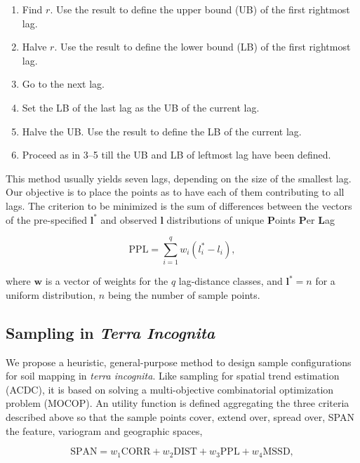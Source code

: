 \begin{enumerate}
 \item Find $r$. Use the result to define the upper bound (UB) of the first rightmost lag.
 \item Halve $r$. Use the result to define the lower bound (LB) of the first rightmost lag.
 \item Go to the next lag.
 \item Set the LB of the last lag as the UB of the current lag.
 \item Halve the UB. Use the result to define the LB of the current lag.
 \item Proceed as in 3--5 till the UB and LB of leftmost lag have been defined.
\end{enumerate}

This method usually yields seven lags, depending on the size of the smallest lag. Our objective is to place the 
points as to have each of them contributing to all lags. The criterion to be minimized is the sum of 
differences between the vectors of the pre-specified $\boldsymbol{l}^*$ and observed $\boldsymbol{l}$ 
distributions of unique \textbf{P}oints \textbf{P}er \textbf{L}ag

\begin{equation}
 \text{PPL} = \sum_{i = 1}^{q} w_i (l_i^* - l_i),
\end{equation}\label{eq:chap08-ppl}

\noindent where $\boldsymbol{w}$ is a vector of weights for the $q$ lag-distance classes, and 
$\boldsymbol{l}^* = n$ for a uniform distribution, $n$ being the number of sample points.

\subsection{Sampling in \emph{Terra Incognita}}

We propose a heuristic, general-purpose method to design sample configurations for soil mapping in \emph{terra 
incognita}. Like sampling for spatial trend estimation (ACDC), it is based on solving a multi-objective 
combinatorial optimization problem (MOCOP). An utility function is defined aggregating the three criteria 
described above so that the sample points cover, extend over, spread over, SPAN the feature, variogram 
and geographic spaces,

\begin{equation}
\text{SPAN} = w_1 \text{CORR} + w_2 \text{DIST} + w_3 \text{PPL} + w_4 \text{MSSD}, 
\end{equation}\label{eq:chap08-span}

